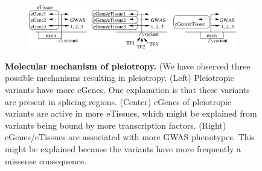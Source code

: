 %
%

\begin{figure}[!]
\centering
%
\begin{subfigure}[]{\textwidth}

\includegraphics[width=\textwidth]{fig/graphical_summary.png}
\end{subfigure}

\caption{\textbf{Molecular mechanism of pleiotropy.} (We have observed three possible mechanisms resulting in pleiotropy. (Left) Pleiotropic variants have more eGenes. One explanation is that these variants are present in splicing regions. (Center) eGenes of pleiotropic variants are active in more eTissues, which might be explained from variants being bound by more transcription factors. (Right) eGenes/eTissues are associated with more GWAS phenotypes. This might be explained because the variants have more frequently a missense consequence.} \label{fig:beta}
%
\end{figure}
